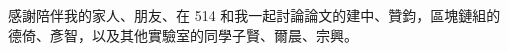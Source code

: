 \begin{acknowledgementszh}
感謝陪伴我的家人、朋友、在 514 和我一起討論論文的建中、贊鈞，區塊鏈組的德倚、彥智，以及其他實驗室的同學子賢、爾晨、宗興。
\end{acknowledgementszh}
